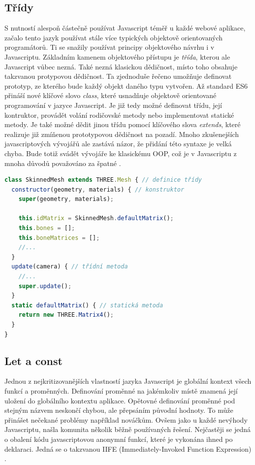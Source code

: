\subsection{Třídy}
S nutností alespoň částečně používat Javascript téměř u každé webové aplikace, začalo tento jazyk používat stále více typických objektově orientovaných programátorů. Ti se snažily používat principy objektového návrhu i v Javascriptu. Základním kamenem objektového přístupu je \textit{třída}, kterou ale Javascript vůbec nezná. Také nezná klasickou dědičnost, místo toho obsahuje takzvanou protypovou dědičnost. Ta zjednoduše řečeno umožňuje definovat prototyp, ze kterého bude každý objekt daného typu vytvořen. Až standard ES6 přináší nové klíčové slovo \textit{class}, které usnadňuje objektově orientované programování v jazyce Javascript. Je již tedy možné definovat třídu, její kontruktor, provádět volání rodičovské metody nebo implementovat statické metody. Je také možné dědit jinou třídu pomocí klíčového slova \textit{extends}, které realizuje již zmíňenou prototypovou dědičnost na pozadí. Mnoho zkušenejších javascriptových vývojářů ale zastává názor, že přidání této syntaxe je velká chyba. Bude totiž svádět vývojáře ke klasickému OOP, což je v Javascriptu z mnoha důvodů považováno za špatné \cite{exploring_es6} \cite{es6} \cite{es6_book}.
\begin{lstlisting}[language=Javascript,caption={Ukázka ES6 syntaxe pro třídy v Javascriptu \cite{es6}}]
class SkinnedMesh extends THREE.Mesh { // definice třídy
  constructor(geometry, materials) { // konstruktor
    super(geometry, materials);

    this.idMatrix = SkinnedMesh.defaultMatrix();
    this.bones = [];
    this.boneMatrices = [];
    //...
  }
  update(camera) { // třídní metoda
    //...
    super.update();
  }
  static defaultMatrix() { // statická metoda
    return new THREE.Matrix4();
  }
}
\end{lstlisting}

\subsection{Let a const}
\label{sec:variable_scope}
Jednou z nejkritizovanějších vlastností jazyka Javascript je globální kontext všech funkcí a proměnných. Definování proměnné na jakémkoliv místě znamená její uložení do globálního kontextu aplikace. Opětovné definování proměnné pod stejným názvem neskončí chybou, ale přepsáním původní hodnoty. To může přinášet nečekané problémy například nováčkům. Ovšem jako u každé nevýhody Javascriptu, našla komunita několik běžně používaných řešení. Nejčastěji se jedná o obalení kódu javascriptovou anonymní funkcí, které je vykonána ihned po deklaraci. Jedná se o takzvanou IIFE (Immediately-Invoked Function Expression) \cite{exploring_es6} \cite{es6} \cite{es6_book}.

